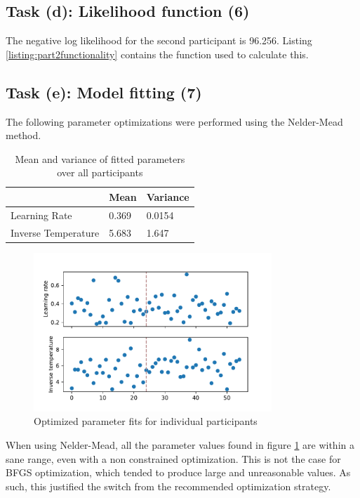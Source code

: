 \documentclass{article}
\begin{document}
\subsection{Task (d): Likelihood function (6)}

The negative log likelihood for the second participant is 96.256. Listing \ref{listing:part2functionality} contains the function used to calculate this.

\subsection{Task (e): Model fitting (7)}

The following parameter optimizations were performed using the Nelder-Mead method.

\begin{table}[H]
  \centering
  \begin{tabular}{@{}lll@{}}
  \toprule
                      & Mean    & Variance     \\ \midrule
  Learning Rate       & 0.369 &  0.0154  \\
  Inverse Temperature & 5.683 &  1.647    \\ \bottomrule
  \end{tabular}
  \caption{Mean and variance of fitted parameters over all participants}
  \label{table:paramaterstatistics}
\end{table}

\begin{figure}[H]
  \centering
  \includegraphics[width=0.8\textwidth]{figures/part2/task5/individual_optimized_parameters.pdf}
  \caption{Optimized parameter fits for individual participants}
  \label{fig:individualoptimizedparameters}
\end{figure}

When using Nelder-Mead, all the parameter values found in figure \ref{fig:individualoptimizedparameters} are within a sane range, even with a non constrained optimization. This is not the case for BFGS optimization, which tended to produce large and unreasonable values. As such, this justified the switch from the recommended optimization strategy.
\end{document}
